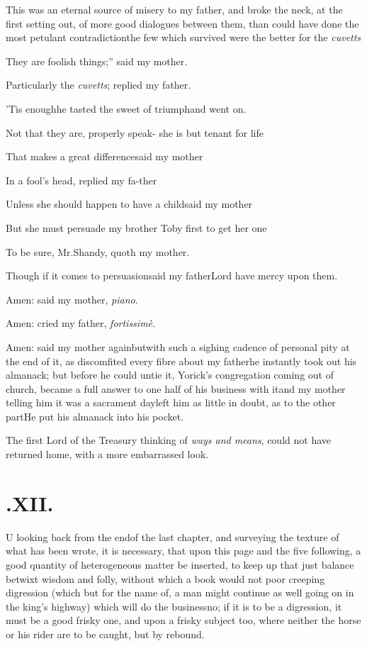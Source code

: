 \documentclass{article}
\begin{document}
This was an eternal source of misery to my father, and broke the
neck, at the first setting out, of more good dialogues between
them, than could have done the most petulant
contradiction\tsh the few which survived were the better
for the \textit{cuvetts}\tsh

\tsk \lqq They are foolish things;” said my
mother.

\tsh Particularly the \textit{cuvetts}; replied my
father.

’Tis enough\tsk he tasted the sweet of triumph\tsk and
went on.

\tsk Not that they are, properly speak-\break
{}
she is but tenant for life\tsh{}

\tsh That makes a great difference\tsk\break said my
mother\tsh

\tsk In a fool’s head, replied my fa-\break ther\tsh

Unless she should happen to have a child\tsk said my
mother\tsh

\tsh But she must persuade my brother Toby first
to get her one\tsk

\tsh To be sure, Mr.\@ Shandy, quoth my mother.

\tsh Though if it comes to persuasion\break\tsk said my
father\tsk Lord have mercy upon them.

Amen: said my mother, \textit{piano}.

Amen: cried my father, \textit{fortissimè}.

Amen: said my mother again\tsk but\break with such a sighing
cadence of personal pity at the end of it, as discomfited every
fibre about my father\tsk he instantly took out his almanack; but
before he could untie it, Yorick’s congregation coming
out of church, became a full answer to one half of his business
with it\tsk and my mother telling him it was a sacrament day\tsk left
him as little in doubt, as to the other part\tsk He put his
almanack into his pocket.

The first Lord of the Treasury thinking of \textit{ways and
means}, could not have returned home, with a more embarrassed
look.

\vfill{}\eject
\section{.\enspace XII.}

\lettrine[findent=3pt, lraise=0.05]{U}{} looking back from the end\break of the last chapter, and surveying
the texture of what has been wrote, it is necessary, that upon this page and the
five following, a good quantity of hete\-rogeneous matter be inserted, to keep up that
just balance betwixt wisdom and folly, without which a book would not
 poor creeping digression (which but for the name of, a
man might continue as well going on in the king’s highway) which will do the
business\tsh no; if it is to be a digression, it must be a good frisky one, and
upon a frisky subject too, where neither the horse or his rider are to be caught,
but by rebound.\etp{}
\end{document}
